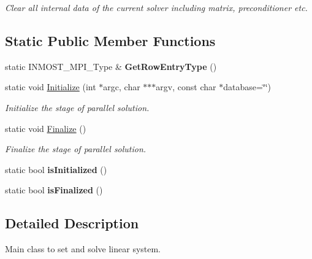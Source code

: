 \begin{DoxyCompactItemize}
\begin{DoxyCompactList}\small\item\em Clear all internal data of the current solver including matrix, preconditioner etc. \end{DoxyCompactList}\end{DoxyCompactItemize}
\subsection*{Static Public Member Functions}
\begin{DoxyCompactItemize}
\item 
\hypertarget{classINMOST_1_1Solver_a763ed109b1c461463b15e782483488ba}{static I\-N\-M\-O\-S\-T\-\_\-\-M\-P\-I\-\_\-\-Type \& {\bfseries Get\-Row\-Entry\-Type} ()}\label{classINMOST_1_1Solver_a763ed109b1c461463b15e782483488ba}

\item 
static void \hyperlink{classINMOST_1_1Solver_ad769ba1a647e89fcefa79951cb41b30d}{Initialize} (int $\ast$argc, char $\ast$$\ast$$\ast$argv, const char $\ast$database=\char`\"{}\char`\"{})
\begin{DoxyCompactList}\small\item\em Initialize the stage of parallel solution. \end{DoxyCompactList}\item 
static void \hyperlink{classINMOST_1_1Solver_a2175540aafc3443eee863734eb5dd63c}{Finalize} ()
\begin{DoxyCompactList}\small\item\em Finalize the stage of parallel solution. \end{DoxyCompactList}\item 
\hypertarget{classINMOST_1_1Solver_a6b867dd84aa2d19e703712061be24830}{static bool {\bfseries is\-Initialized} ()}\label{classINMOST_1_1Solver_a6b867dd84aa2d19e703712061be24830}

\item 
\hypertarget{classINMOST_1_1Solver_a1f824e4ce1d3dcf4cfd3cc5bd64c721a}{static bool {\bfseries is\-Finalized} ()}\label{classINMOST_1_1Solver_a1f824e4ce1d3dcf4cfd3cc5bd64c721a}

\end{DoxyCompactItemize}


\subsection{Detailed Description}
Main class to set and solve linear system. 

